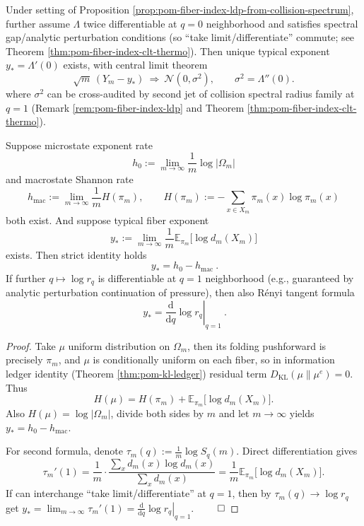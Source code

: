 \begin{corollary}\label{cor:pom-fiber-index-clt-variance-certificate}
Under setting of Proposition \ref{prop:pom-fiber-index-ldp-from-collision-spectrum}, further assume \(\Lambda\) twice differentiable at \(q=0\) neighborhood and satisfies spectral gap/analytic perturbation conditions (so ``take limit/differentiate'' commute; see Theorem \ref{thm:pom-fiber-index-clt-thermo}).
Then unique typical exponent \(y_\ast=\Lambda'(0)\) exists, with central limit theorem
\[
\sqrt{m}\,(Y_m-y_\ast)\ \Longrightarrow\ \mathcal N(0,\sigma^2),
\qquad
\sigma^2=\Lambda''(0).
\]
where \(\sigma^2\) can be cross-audited by second jet of collision spectral radius family at \(q=1\) (Remark \ref{rem:pom-fiber-index-ldp} and Theorem \ref{thm:pom-fiber-index-clt-thermo}).
\end{corollary}

\begin{proposition}[Rényi tangent formula for typical fiber exponent: derivative at \texorpdfstring{$q=1$}{q=1} is average information loss rate]\label{prop:pom-typical-fiber-exponent-renyi-tangent}
Suppose microstate exponent rate
\[
h_0:=\lim_{m\to\infty}\frac{1}{m}\log|\Omega_m|
\]
and macrostate Shannon rate
\[
h_{\mathrm{mac}}:=\lim_{m\to\infty}\frac{1}{m}H(\pi_m),
\qquad
H(\pi_m):=-\sum_{x\in X_m}\pi_m(x)\log\pi_m(x)
\]
both exist.
And suppose typical fiber exponent
\[
y_\ast:=\lim_{m\to\infty}\frac{1}{m}\mathbb{E}_{\pi_m}\!\bigl[\log d_m(X_m)\bigr]
\]
exists.
Then strict identity holds
\[
\boxed{\ y_\ast=h_0-h_{\mathrm{mac}}\ }.
\]
If further \(q\mapsto \log r_q\) is differentiable at \(q=1\) neighborhood (e.g., guaranteed by analytic perturbation continuation of pressure), then also Rényi tangent formula
\[
\boxed{\ y_\ast=\left.\frac{\mathrm d}{\mathrm dq}\log r_q\right|_{q=1}\ }.
\]
\end{proposition}
\begin{proof}
Take \(\mu\) uniform distribution on \(\Omega_m\), then its folding pushforward is precisely \(\pi_m\), and \(\mu\) is conditionally uniform on each fiber, so in information ledger identity (Theorem \ref{thm:pom-kl-ledger}) residual term \(D_{\mathrm{KL}}(\mu\|\mu^{e})=0\).
Thus
\[
H(\mu)=H(\pi_m)+\mathbb{E}_{\pi_m}\!\bigl[\log d_m(X_m)\bigr].
\]
Also \(H(\mu)=\log|\Omega_m|\), divide both sides by \(m\) and let \(m\to\infty\) yields \(y_\ast=h_0-h_{\mathrm{mac}}\).
\par
For second formula, denote \(\tau_m(q):=\frac{1}{m}\log S_q(m)\). Direct differentiation gives
\[
\tau_m'(1)=\frac{1}{m}\cdot\frac{\sum_{x}d_m(x)\log d_m(x)}{\sum_x d_m(x)}
=\frac{1}{m}\mathbb{E}_{\pi_m}\!\bigl[\log d_m(X_m)\bigr].
\]
If can interchange ``take limit/differentiate'' at \(q=1\), then by \(\tau_m(q)\to \log r_q\) get
\(
y_\ast=\lim_{m\to\infty}\tau_m'(1)=\left.\frac{\mathrm d}{\mathrm dq}\log r_q\right|_{q=1}
\).
$\qed$
\end{proof}

